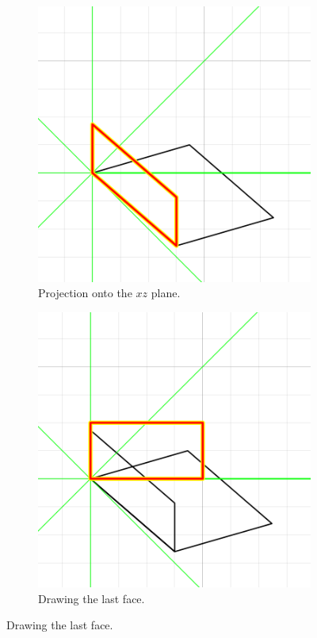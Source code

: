 \documentclass[11pt,a4paper]{article}
\begin{document}
\begin{figure}
\begin{subfigure}[t]{0.4\textwidth}
\centering
\includegraphics[scale=0.6]{png/demo_step5.png} 
\caption{Projection onto the $xz$ plane.}
\label{fig:demo1_e}
\end{subfigure}
\begin{subfigure}[t]{0.4\textwidth}
\centering
\includegraphics[scale=0.6]{png/demo_step6.png} 
\caption{Drawing the last face.}
\label{fig:demo1_f}
\end{subfigure}


\end{figure}
\end{document}
